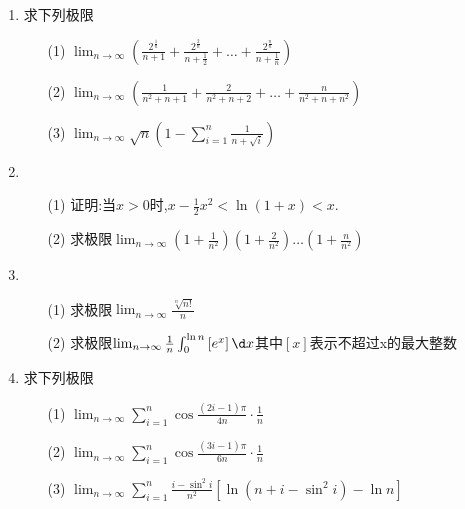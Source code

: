 \documentclass[12pt, a4paper, oneside, UTF8]{ctexbook}
\begin{document}
\begin{enumerate}
    \newpage
    
    \item 求下列极限
    \begin{enumerate}
        \item [(1)] $\lim_{n\to\infty}\left(\frac{2^{\frac{1}{n}}}{n+1}+\frac{2^{\frac{2}{n}}}{n+\frac{1}{2}}+\ldots+\frac{2^{\frac{n}{n}}}{n+\frac{1}{n}}\right)$
        \item [(2)] $\lim_{n\to\infty}\left(\frac{1}{n^2+n+1}+\frac{2}{n^2+n+2}+\ldots+\frac{n}{n^2+n+n^2}\right)$ 
        \item [(3)] $\lim_{n\to\infty}\sqrt{n}\left(1-\sum_{i=1}^{n}\frac{1}{n+\sqrt{i}}\right)$
    \end{enumerate}
    
    \newpage
    
    \item 
    \begin{enumerate}
        \item [(1)] 证明:当$x>0$时,$x-\frac{1}{2}x^2<\ln{(1+x)}<x$.
        \item [(2)] 求极限$\lim_{n\to\infty}\left(1+\frac{1}{n^2}\right)\left(1+\frac{2}{n^2}\right)\ldots\left(1+\frac{n}{n^2}\right)$
    \end{enumerate}
    
    \newpage
    
    \item 
    \begin{enumerate}
        \item [(1)] 求极限$\lim_{n\to\infty}\frac{\sqrt[n]{n!}}{n}$
        \item [(2)] 求极限$\lim_{n\to\infty}\frac{1}{n}\int_{0}^{\ln{n}}\left[e^x\right]\d x$其中$[x]$表示不超过x的最大整数
    \end{enumerate}
    
    \newpage
    
    \item 求下列极限
    \begin{enumerate}
        \item [(1)] $\lim_{n\to\infty}\sum_{i=1}^{n}\cos{\frac{(2i-1)\pi}{4n}}\cdot\frac{1}{n}$
        \item [(2)] $\lim_{n\to\infty}\sum_{i=1}^{n}\cos{\frac{(3i-1)\pi}{6n}}\cdot\frac{1}{n}$
        \item [(3)] $\lim_{n\to\infty}\sum_{i=1}^{n}\frac{i-\sin^2{i}}{n^2}\left[\ln{(n+i-\sin^2{i})-\ln{n}}\right]$
    \end{enumerate}
    

\end{enumerate}
\end{document}
